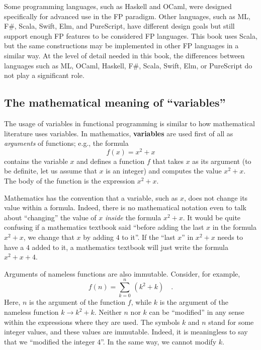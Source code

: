 Some programming languages, such as Haskell and OCaml, were designed
specifically for advanced use in the FP paradigm. Other languages,
such as ML, F\#, Scala, Swift, Elm, and PureScript, have different
design goals but still support enough FP features to be considered
FP languages. This book uses Scala, but the same constructions may
be implemented in other FP languages in a similar way. At the level
of detail needed in this book, the differences between languages such
as ML, OCaml, Haskell, F\#, Scala, Swift, Elm, or PureScript do not
play a significant role.

\subsection{The mathematical meaning of \textsf{``}variables\textsf{''}}

The usage of variables in functional programming is similar to how
mathematical literature uses variables. In mathematics, \textbf{variables}
are used first of all as \emph{arguments} of functions; e.g., the
formula 
\[
f(x)=x^{2}+x
\]
contains the variable $x$ and defines a function $f$ that takes
$x$ as its argument (to be definite, let us assume that $x$ is an
integer) and computes the value $x^{2}+x$. The body of the function
is the expression $x^{2}+x$. 

Mathematics has the convention that a variable, such as $x$, does
not change its value within a formula. Indeed, there is no mathematical
notation even to talk about \textsf{``}changing\textsf{''} the value of $x$ \emph{inside}
the formula $x^{2}+x$. It would be quite confusing if a mathematics
textbook said \textsf{``}before adding the last $x$ in the formula $x^{2}+x$,
we change that $x$ by adding $4$ to it\textsf{''}. If the \textsf{``}last $x$\textsf{''}
in $x^{2}+x$ needs to have a $4$ added to it, a mathematics textbook
will just write the formula $x^{2}+x+4$.

Arguments of nameless functions are also immutable. Consider, for
example,
\[
f(n)=\sum_{k=0}^{n}\,(k^{2}+k)\quad.
\]
Here, $n$ is the argument of the function $f$, while $k$ is the
argument of the nameless function $k\rightarrow k^{2}+k$. Neither
$n$ nor $k$ can be \textsf{``}modified\textsf{''} in any sense within the expressions
where they are used. The symbols $k$ and $n$ stand for some integer
values, and these values are immutable. Indeed, it is meaningless
to say that we \textsf{``}modified the integer $4$\textsf{''}. In the same way, we
cannot modify $k$.

